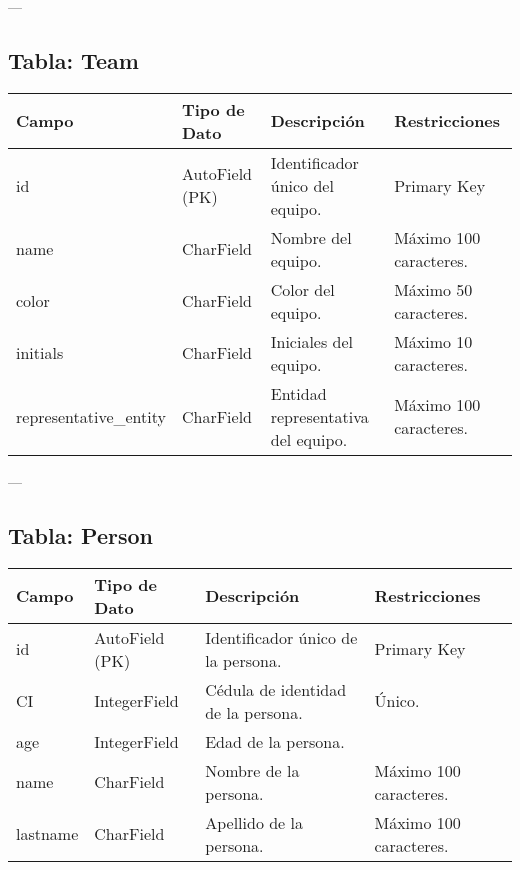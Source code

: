 \documentclass{report}
\begin{document}
    ---
    
    \subsection*{Tabla: Team}
    \begin{tabular}{|>{\raggedright\arraybackslash}p{3cm}|>{\raggedright\arraybackslash}p{3cm}|>{\raggedright\arraybackslash}p{6cm}|>{\raggedright\arraybackslash}p{4cm}|}
        \hline
        \textbf{Campo} & \textbf{Tipo de Dato} & \textbf{Descripción} & \textbf{Restricciones} \\
        \hline
        id & AutoField (PK) & Identificador único del equipo. & Primary Key \\
        \hline
        name & CharField & Nombre del equipo. & Máximo 100 caracteres. \\
        \hline
        color & CharField & Color del equipo. & Máximo 50 caracteres. \\
        \hline
        initials & CharField & Iniciales del equipo. & Máximo 10 caracteres. \\
        \hline
        representative\_entity & CharField & Entidad representativa del equipo. & Máximo 100 caracteres. \\
        \hline
    \end{tabular}
    
    ---
    
    \subsection*{Tabla: Person}
    \begin{tabular}{|>{\raggedright\arraybackslash}p{3cm}|>{\raggedright\arraybackslash}p{3cm}|>{\raggedright\arraybackslash}p{6cm}|>{\raggedright\arraybackslash}p{4cm}|}
        \hline
        \textbf{Campo} & \textbf{Tipo de Dato} & \textbf{Descripción} & \textbf{Restricciones} \\
        \hline
        id & AutoField (PK) & Identificador único de la persona. & Primary Key \\
        \hline
        CI & IntegerField & Cédula de identidad de la persona. & Único. \\
        \hline
        age & IntegerField & Edad de la persona. &  \\
        \hline
        name & CharField & Nombre de la persona. & Máximo 100 caracteres. \\
        \hline
        lastname & CharField & Apellido de la persona. & Máximo 100 caracteres. \\
        \hline
    \end{tabular}
    
\end{document}
